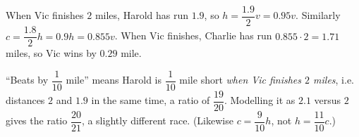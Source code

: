 When Vic finishes $2$ miles, Harold has run $1.9$, so $h=\dfrac{1.9}{2}v=0.95v$. Similarly $c=\dfrac{1.8}{2}h=0.9h=0.855v$. When Vic finishes, Charlie has run $0.855\cdot2=1.71$ miles, so Vic wins by $\boxed{0.29}$ mile.

``Beats by $\dfrac1{10}$ mile'' means Harold is $\dfrac1{10}$ mile short \emph{when Vic finishes $2$ miles}, i.e. distances $2$ and $1.9$ in the same time, a ratio of $\dfrac{19}{20}$. Modelling it as $2.1$ versus $2$ gives the ratio $\dfrac{20}{21}$, a slightly different race. (Likewise $c=\dfrac9{10}h$, not $h=\dfrac{11}{10}c$.)
